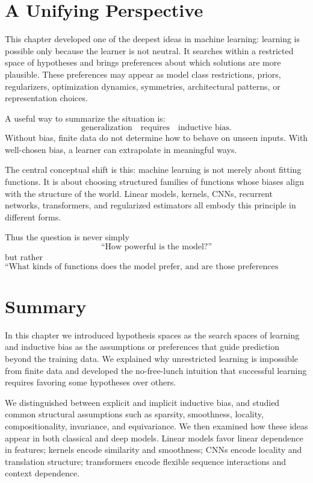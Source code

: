 \section{A Unifying Perspective}

This chapter developed one of the deepest ideas in machine learning: learning is possible only because the learner is not neutral. It searches within a restricted space of hypotheses and brings preferences about which solutions are more plausible. These preferences may appear as model class restrictions, priors, regularizers, optimization dynamics, symmetries, architectural patterns, or representation choices.

A useful way to summarize the situation is:
\[
\text{generalization} \quad \text{requires} \quad \text{inductive bias}.
\]
Without bias, finite data do not determine how to behave on unseen inputs. With well-chosen bias, a learner can extrapolate in meaningful ways.

The central conceptual shift is this: machine learning is not merely about fitting functions. It is about choosing structured families of functions whose biases align with the structure of the world. Linear models, kernels, CNNs, recurrent networks, transformers, and regularized estimators all embody this principle in different forms.

Thus the question is never simply
\[
\text{``How powerful is the model?''}
\]
but rather
\[
\text{``What kinds of functions does the model prefer, and are those preferences appropriate for the task?''}
\]

\section{Summary}

In this chapter we introduced hypothesis spaces as the search spaces of learning and inductive bias as the assumptions or preferences that guide prediction beyond the training data. We explained why unrestricted learning is impossible from finite data and developed the no-free-lunch intuition that successful learning requires favoring some hypotheses over others.

We distinguished between explicit and implicit inductive bias, and studied common structural assumptions such as sparsity, smoothness, locality, compositionality, invariance, and equivariance. We then examined how these ideas appear in both classical and deep models. Linear models favor linear dependence in features; kernels encode similarity and smoothness; CNNs encode locality and translation structure; transformers encode flexible sequence interactions and context dependence.

